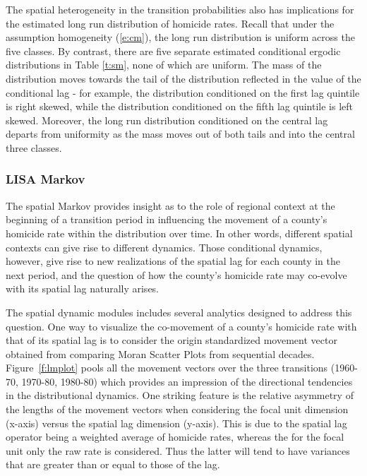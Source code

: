 \documentclass[11pt, titlepage]{article}
\begin{document}
The spatial heterogeneity in the transition probabilities also has
implications for the estimated long run distribution of homicide rates.
Recall that under the assumption homogeneity (\ref{e:cm}), the long run
distribution is uniform across the five classes. By contrast, there are
five separate estimated conditional ergodic distributions in Table
\ref{t:sm},
none of which are uniform. The mass of the distribution moves towards
the tail of the distribution reflected in the value of the conditional
lag - for example, the distribution conditioned on the first lag
quintile is right skewed, while the distribution conditioned on the
fifth lag quintile is left skewed. Moreover, the long run distribution
conditioned on the central lag departs from uniformity as the mass moves
out of both tails and into the central three classes.


\subsubsection{LISA Markov}
The spatial Markov provides insight as to the role of regional context
at the beginning of a transition period in influencing the movement of a
county's homicide rate within the distribution over time. In other
words, different spatial contexts can give rise to different dynamics.
Those conditional dynamics, however, give rise to new realizations of
the spatial lag for each county in the next period, and the question of
how the county's homicide rate may co-evolve with its spatial lag
naturally arises.

The spatial dynamic modules includes several analytics designed to
address this question. One way to visualize the co-movement of a
county's homicide rate with that of its spatial lag is to consider the
origin standardized movement vector \citep{Rey:2011uq} obtained from comparing Moran
Scatter Plots \citep{Anselin:1996ze} from sequential decades.
Figure~\ref{f:lmplot} pools all the movement vectors over the three
transitions (1960-70, 1970-80, 1980-80) which  provides an impression of
the directional tendencies in the distributional dynamics. One striking
feature is the relative asymmetry of the lengths of the movement vectors
when considering the focal unit dimension (x-axis) versus the spatial lag
dimension (y-axis). This is due to  the spatial lag operator being a weighted
average of homicide rates, whereas the for the focal unit only the raw
rate is considered. Thus the latter will tend to have variances that are
greater than or equal to those of the lag.
\end{document}
